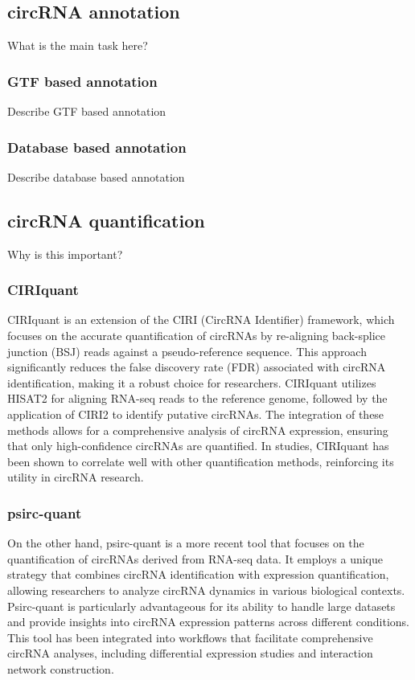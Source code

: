 \subsection{circRNA annotation}
What is the main task here?

\subsubsection{GTF based annotation}
Describe GTF based annotation 

\subsubsection{Database based annotation} Describe database based annotation

\subsection{circRNA quantification} 

Why is this important?

\subsubsection{CIRIquant}
CIRIquant is an extension of the CIRI (CircRNA Identifier) framework, which
focuses on the accurate quantification of circRNAs by re-aligning back-splice
junction (BSJ) reads against a pseudo-reference sequence.
This approach significantly reduces the false discovery rate (FDR) associated
with circRNA identification, making it a robust choice for
researchers\supercite{zhang_accurate_2020}.
CIRIquant utilizes HISAT2 for aligning RNA-seq reads to the reference genome,
followed by the application of CIRI2 to identify putative circRNAs.
The integration of these methods allows for a comprehensive analysis of circRNA
expression, ensuring that only high-confidence circRNAs are
quantified\supercite{munz_exonintron_2021,made_circrna-mirna-mrna_2023}.
In studies, CIRIquant has been shown to correlate well with other
quantification methods, reinforcing its utility in circRNA
research\supercite{zhang_accurate_2020}.

\subsubsection{psirc-quant}
On the other hand, psirc-quant is a more recent tool that focuses on the
quantification of circRNAs derived from RNA-seq data.
It employs a unique strategy that combines circRNA identification with
expression quantification, allowing researchers to analyze circRNA dynamics in
various biological contexts.
Psirc-quant is particularly advantageous for its ability to handle large
datasets and provide insights into circRNA expression patterns across different
conditions\supercite{yu_quantifying_2021}.
This tool has been integrated into workflows that facilitate comprehensive
circRNA analyses, including differential expression studies and interaction
network construction\supercite{zhang_expression_2022}.

